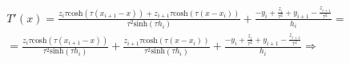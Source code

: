 \documentclass{article}
\begin{document}
  \begin{multline*}
    T'(x) =
           \frac{
             z_i\tau\mathrm{cosh}(\tau(x_{i+1}-x)) +
             z_{i+1}\tau\textrm{cosh}(\tau(x-x_{i}))
           }
           {
             \tau^2\textrm{sinh}(\tau h_i)
           }
           +
           \frac {
             -y_i+\frac{z_i}{\tau^2} +
             y_{i+1}-\frac{z_{i+1}}{\tau^2}
           }
           {
             h_i
           }
           =
           \\
           =
           \frac{
             z_i\tau\mathrm{cosh}(\tau(x_{i+1}-x))
           }
           {
             \tau^2\textrm{sinh}(\tau h_i)
           }
           +
           \frac{
             z_{i+1}\tau\textrm{cosh}(\tau(x-x_{i}))
           }
           {
             \tau^2\textrm{sinh}(\tau h_i)
           }
           +
           \frac {
             -y_i+\frac{z_i}{\tau^2} +
             y_{i+1}-\frac{z_{i+1}}{\tau^2}
           }
           {
             h_i
           }
           \Rightarrow
           \\

\end{multline*}
\end{document}
